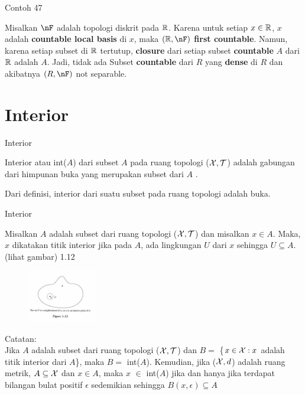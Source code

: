 \begin{frame}{Contoh 47}
    \begin{tcolorbox}[enhanced,title=Contoh 47, frame style tile={width=\paperwidth}{\wallpaper}]
        Misalkan $\nF$ adalah topologi diskrit pada $\mathbb{R}$. Karena untuk setiap $x \in \mathbb{R} $, ${x}$ adalah \textbf{countable local basis} di $x$, maka $(\R,\nF)$ \textbf{first countable}. Namun, karena setiap subset di $\mathbb{R}$ tertutup, \textbf{closure} dari setiap subset \textbf{countable} $A$ dari $\mathbb{R}$ adalah $A$. Jadi, tidak ada Subset \textbf{countable} dari $R$ yang \textbf{dense} di $R$ dan akibatnya $(R, \nF)$ not separable.
    \end{tcolorbox}
\end{frame}
\section{Interior}
\begin{frame}{Interior}
    \begin{tcolorbox}[enhanced,title=Definisi, frame style tile={width=\paperwidth}{\wallpaper}]
        Interior atau int($A$) dari subset $A$ pada ruang topologi ($\mathcal{X}, \mathcal{T}$) adalah gabungan dari himpunan buka yang merupakan subset dari $A$ .
    \end{tcolorbox}

    \begin{tcolorbox}[enhanced,title=Catatan, frame style tile={width=\paperwidth}{\wallpaper}]
        Dari definisi, interior dari suatu subset pada ruang topologi adalah buka.
    \end{tcolorbox}
\end{frame}

\begin{frame}{Interior}
    \begin{tcolorbox}[enhanced,title=Definisi, frame style tile={width=\paperwidth}{\wallpaper}]
        Misalkan $A$ adalah subset dari ruang topologi ($\mathcal{X}, \mathcal{T}$) dan misalkan $x \in A$. Maka, $x$ dikatakan titik interior jika pada $A$, ada lingkungan $U$ dari $x$ sehingga $U \subseteq A$. (lihat gambar) 1.12
    \begin{figure}
        \centering
        \includegraphics[width=3cm]{pembagian/Figure 1.12.jpg}
        \label{fig:enter-label}
    \end{figure}

    \end{tcolorbox}
Catatan:\\
Jika $A$ adalah subset dari ruang topologi ($\mathcal{X}, \mathcal{T}$) dan $B =$ \{$x \in \mathcal{X} : x$ adalah titik interior dari $A$\}, maka $B =$ int($A$). Kemudian, jika ($\mathcal{X},d$) adalah ruang metrik, $A \subseteq \mathcal{X}$ dan $x \in A $, maka $x$ $\in$ int($A$) jika dan hanya jika terdapat bilangan bulat positif $\epsilon$ sedemikian sehingga $B(x,\epsilon) \subseteq A$
\end{frame}

